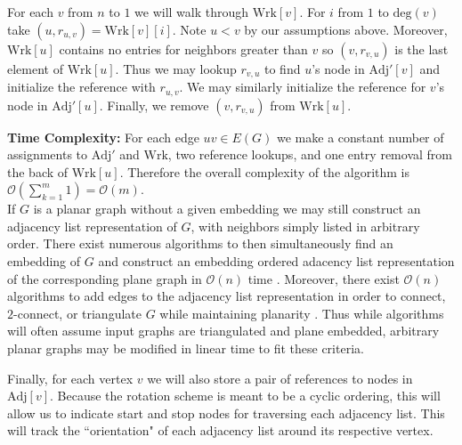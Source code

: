 \documentclass[letterpaper, 12pt]{amsart}
\theoremstyle{definition}
\theoremstyle{definition}
\theoremstyle{thm}
\theoremstyle{definition}
\begin{document}
For each $v$ from $n$ to $1$ we will walk through $\text{Wrk}[v]$. For $i$ from
$1$ to $\text{deg}(v)$ take $(u,r_{u,v})=\text{Wrk}[v][i]$. Note $u<v$ by our
assumptions above. Moreover, $\text{Wrk}[u]$ contains no entries for neighbors
greater than $v$ so $(v,r_{v,u})$ is the last element of $\text{Wrk}[u]$. Thus
we may lookup $r_{v,u}$ to find $u$'s node in $\text{Adj}'[v]$ and initialize the
reference with $r_{u,v}$. We may similarly initialize the reference for $v$'s
node in $\text{Adj}'[u]$. Finally, we remove $(v,r_{v,u})$ from $\text{Wrk}[u]$.

\noindent\textbf{Time Complexity:} For each edge $uv\in E(G)$ we make a constant
number of assignments to $\text{Adj}'$ and $\text{Wrk}$, two reference
lookups, and one entry removal from the back of $\text{Wrk}[u]$.
Therefore the overall complexity of the algorithm is
$\mathcal{O}\left(\sum_{k=1}^m 1\right)=\mathcal{O}(m)$.\\

If $G$ is a planar graph without a given embedding we may still construct an
adjacency list representation of $G$, with neighbors simply listed in arbitrary
order. There exist numerous algorithms to then simultaneously find an embedding
of $G$ and construct an embedding ordered adacency list representation of the
corresponding plane graph in $\mathcal{O}(n)$ time \cite{tarjan, lempel, boyer,
booth}. Moreover, there exist $\mathcal{O}(n)$ algorithms to add edges
to the adjacency list representation in order to connect, $2$-connect, or
triangulate $G$ while maintaining planarity \cite{hagerup,reed,eswaran}. Thus while algorithms will
often assume input graphs are triangulated and plane embedded, arbitrary planar
graphs may be modified in linear time to fit these criteria.

Finally, for each vertex $v$ we will also store a pair of references to nodes in
$\text{Adj}[v]$. Because the rotation scheme is meant to be a cyclic ordering,
this will allow us to indicate start and stop nodes for traversing each adjacency
list. This will track the ``orientation" of each adjacency list around its
respective vertex.

\begin{comment}
If $G$ is a $2$-connected weakly triangulated graph with an outer cycle
$C=v_1v_2\ldots v_k$, vertices listed in clockwise order. We shall set the
the neighbor range of $v_i$ such that the start and indices are the indices of
$v_{i-1}$ and $v_{i+1}$ in $A[v_i]$, respectively. These indices are consider
in a cyclic manner, that is we consider $v_{0}=v_k$, $v_1=v_{k+1}$, and so on.
Many of the algorithms considered will work by removing one vertex at a time,
and considering the remaining graph using the maximal $2$-connected
subgraphs. If $v$ on the outer face, we may remove $v$ from $G$ by contracting
the neighhbor ranges for its neighboring vertices on the outer face exclude $v$.
Interior neighborrs will be If one of the
neighbors of $v$ is a cutvertex once $G$ is removed, we will split into two
\end{comment}
\end{document}

